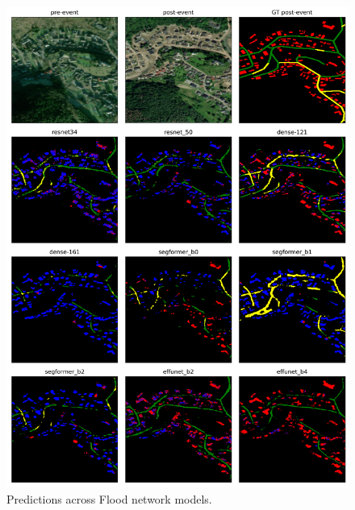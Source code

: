 \documentclass[10pt,twocolumn,letterpaper]{article}
\begin{document}
\clearpage
\begin{figure}[t]
 \centering
  \includegraphics[width=2\linewidth]{final-report/figures/sample_images_flood_1.png}
  \caption{Predictions across Flood network models.}
  \label{fig:sample_images_flood_1}
\end{figure}
\end{document}
